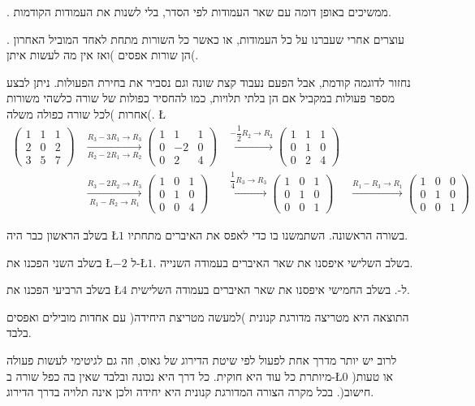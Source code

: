 {\endL}. ממשיכים באופן דומה עם שאר העמודות לפי הסדר, בלי
לשנות את העמודות הקודמות.

{\endL}. עוצרים אחרי שעברנו על כל העמודות, או כאשר כל השורות
מתחת לאחד המוביל האחרון הן שורות אפסים )ואז אין מה לעשות איתן(.

\begin{example}
נחזור לדוגמה קודמת, אבל הפעם נעבוד קצת שונה וגם נסביר את בחירת הפעולות. ניתן לבצע מספר פעולות במקביל אם הן בלתי תלויות, כמו להחסיר כפולות של שורה כלשהי משורות אחרות )לכל שורה כפולה משלה(. 
\L{%
\begin{equation*}
	\begin{aligned}
		\begin{pmatrix}1 & 1 & 1 \\ 2 & 0 & 2 \\ 3 & 5 & 7 \end{pmatrix}
		&\xrightarrow[R_2-2R_1 \to R_2]{R_3-3R_1 \to R_3}
		\begin{pmatrix}1 & 1 & 1 \\ 0 & -2 & 0 \\ 0 & 2 & 4\end{pmatrix}
		&\xrightarrow{-\dfrac{1}{2}R_2 \to R_2}
		\begin{pmatrix}1 & 1 & 1 \\ 0 & 1 & 0 \\ 0 & 2 & 4 \end{pmatrix} \\
		&\xrightarrow[R_1-R_2 \to R_1]{R_3-2R_2 \to R_3}
		\begin{pmatrix}1 & 0 & 1 \\ 0 & 1 & 0 \\ 0 & 0 & 4\end{pmatrix}
		&\xrightarrow{\dfrac{1}{4}R_3 \to R_3}
		\begin{pmatrix}1 & 0 & 1 \\ 0 & 1 & 0 \\ 0 & 0 & 1\end{pmatrix}
		&\xrightarrow{R_1-R_3 \to R_1}
		\begin{pmatrix}1 & 0 & 0 \\ 0 & 1 & 0 \\ 0 & 0 & 1\end{pmatrix}
	\end{aligned}
\end{equation*}
}%

בשלב הראשון כבר היה \L{$1$} בשורה הראשונה. השתמשנו בו כדי לאפס את
האיברים מתחתיו. 

בשלב השני הפכנו את \L{$-2$} ל-\L{$1$}. בשלב השלישי איפסנו את שאר
האיברים בעמודה השנייה.

בשלב הרביעי הפכנו את \L{$4$} ל-{\endL}. בשלב החמישי איפסנו
את שאר האיברים בעמודה השלישית.

התוצאה היא מטריצה מדורגת קנונית )למעשה מטריצת היחידה( עם אחדות מובילים ואפסים בלבד.
\end{example}

\begin{remark}
לרוב יש יותר מדרך אחת לפעול לפי שיטת הדירוג של גאוס, וזה גם לגיטימי לעשות פעולה מיותרת כל עוד היא חוקית. כל דרך
היא נכונה ובלבד שאין בה כפל שורה ב-\L{$0$} )או טעות חישוב(. בכל מקרה הצורה המדורגת קנונית
היא יחידה ולכן אינה תלויה בדרך הדירוג.
\end{remark}
%


